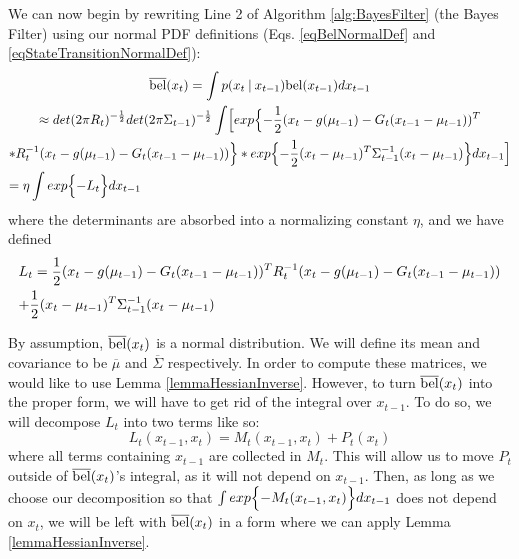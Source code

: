We can now begin by rewriting Line 2 of Algorithm \ref{alg:BayesFilter} (the Bayes Filter) using our normal PDF definitions (Eqs. \ref{eqBelNormalDef} and \ref{eqStateTransitionNormalDef}):
\begin{multline} \label{eqBelBarLt}
\overline{\bel}(x_t) = \int p(x_t \mathbin{\vert} x_{t-1}) \bel(x_{t-1})dx_{t-1} \\
\approx det(2 \pi R_t)^{-\frac{1}{2}} det(2 \pi \Sigma_{t-1})^{-\frac{1}{2}} \int \Bigl[ exp\Bigl\{-\frac{1}{2} (x_t - g(\mu_{t-1}) - G_t (x_{t-1} - \mu_{t-1}))^T \\ * R_t^{-1} (x_t - g(\mu_{t-1}) - G_t (x_{t-1} - \mu_{t-1})) \Bigr\} * exp \Bigl\{-\frac{1}{2} (x_t - \mu_{t-1})^T \Sigma_{t-1}^{-1} (x_t - \mu_{t-1}) \Bigr\}dx_{t-1} \Bigr] \\
= \eta \int exp\Bigl\{-L_t\Bigr\}dx_{t-1} \hfill
\end{multline}
where the determinants are absorbed into a normalizing constant \(\eta\), and we have defined
\begin{multline} \label{eqDefLt}
L_t = \frac{1}{2} (x_t - g(\mu_{t-1}) - G_t (x_{t-1} - \mu_{t-1}))^T R_t^{-1} (x_t - g(\mu_{t-1}) - G_t (x_{t-1} - \mu_{t-1}))\\
+ \frac{1}{2} (x_t - \mu_{t-1})^T \Sigma_{t-1}^{-1} (x_t - \mu_{t-1}) \hfill
\end{multline}

By assumption, \(\overline{\mathrm{bel}}(x_t)\) is a normal distribution. We will define its mean and covariance to be \(\overline{\mu}\) and \(\overline{\Sigma}\) respectively. In order to compute these matrices, we would like to use Lemma \ref{lemmaHessianInverse}. However, to turn \(\overline{\mathrm{bel}}(x_t)\) into the proper form, we will have to get rid of the integral over \(x_{t-1}\). To do so, we will decompose \(L_t\) into two terms like so: \begin{equation} \label{eqLtDecomp}
L_t(x_{t-1},x_t) = M_t(x_{t-1},x_t) + P_t(x_t)
\end{equation}
where all terms containing \(x_{t-1}\) are collected in \(M_t\). This will allow us to move \(P_t\) outside of \(\overline{\mathrm{bel}}(x_t)\)'s integral, as it will not depend on \(x_{t-1}\). Then, as long as we choose our decomposition so that \(\int exp\Bigl\{ -M_t(x_{t-1},x_t)\Bigr\}dx_{t-1}\) does not depend on \(x_t\), we will be left with \(\overline{\mathrm{bel}}(x_t)\) in a form where we can apply Lemma \ref{lemmaHessianInverse}.

